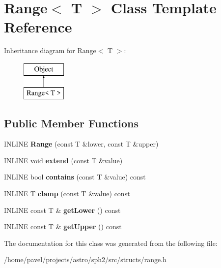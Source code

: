 \hypertarget{classRange}{}\section{Range$<$ T $>$ Class Template Reference}
\label{classRange}
Inheritance diagram for Range$<$ T $>$\+:\begin{figure}[H]
\begin{center}
\leavevmode
\includegraphics[height=2.000000cm]{classRange}
\end{center}
\end{figure}
\subsection*{Public Member Functions}
\begin{DoxyCompactItemize}
\item 
\hypertarget{classRange_a290eaf342b8335196c3ed8cb99b08bf5}{}\label{classRange_a290eaf342b8335196c3ed8cb99b08bf5} 
I\+N\+L\+I\+NE {\bfseries Range} (const T \&lower, const T \&upper)
\item 
\hypertarget{classRange_a92d6878760432c356fb61ebbefde8b89}{}\label{classRange_a92d6878760432c356fb61ebbefde8b89} 
I\+N\+L\+I\+NE void {\bfseries extend} (const T \&value)
\item 
\hypertarget{classRange_afda3d0ddbcd5cfd1e66d80d2b741c0a8}{}\label{classRange_afda3d0ddbcd5cfd1e66d80d2b741c0a8} 
I\+N\+L\+I\+NE bool {\bfseries contains} (const T \&value) const
\item 
\hypertarget{classRange_a064a8c9ada68b6e70dee234ee7f0595f}{}\label{classRange_a064a8c9ada68b6e70dee234ee7f0595f} 
I\+N\+L\+I\+NE T {\bfseries clamp} (const T \&value) const
\item 
\hypertarget{classRange_a97cdd8f707a0356a38bcb302d253be26}{}\label{classRange_a97cdd8f707a0356a38bcb302d253be26} 
I\+N\+L\+I\+NE const T \& {\bfseries get\+Lower} () const
\item 
\hypertarget{classRange_aef738274a91ebdcaa0e8bccf8753fd9a}{}\label{classRange_aef738274a91ebdcaa0e8bccf8753fd9a} 
I\+N\+L\+I\+NE const T \& {\bfseries get\+Upper} () const
\end{DoxyCompactItemize}


The documentation for this class was generated from the following file\+:\begin{DoxyCompactItemize}
\item 
/home/pavel/projects/astro/sph2/src/structs/range.\+h\end{DoxyCompactItemize}
